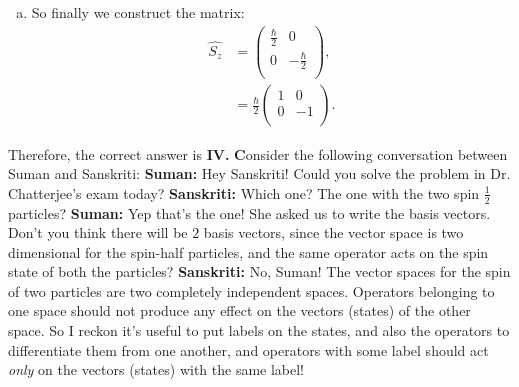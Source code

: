 \documentclass[12pt]{article}
\begin{document}
\begin{enumerate}[1.]
\begin{enumerate}[(a)]
\begin{enumerate}[i.]
                     \end{enumerate} 
              \item So finally we construct the matrix:
                     $$
                            \begin{aligned}
                                   \hat{S_z} & = \left( \begin{array}{lr}
                                                 \frac{\hbar}{2} & 0 \\
                                                 0 & -\frac{\hbar}{2} \\
                                                 \end{array} \right), \\
                                          & = \frac{\hbar}{2} \left( \begin{array}{lr}
                                                 1 & 0 \\
                                                 0 & -1 \\
                                                 \end{array} \right).
                            \end{aligned}
                     $$
       \end{enumerate}
       Therefore, the correct answer is \textbf{IV.} %
       \newpage
\textbf{C}onsider the following conversation between Suman and Sanskriti: \newline
\textbf{Suman:} Hey Sanskriti! Could you solve the problem in Dr. Chatterjee's exam today? \newline
\textbf{Sanskriti:} Which one? The one with the two spin $\frac{1}{2}$ particles? \newline
\textbf{Suman:} Yep that's the one! She asked us to write the basis vectors. Don't you think there will be $2$ basis vectors, since the vector space is two dimensional for the spin-half particles, and the same operator acts on the spin state of both the particles? \newline
\textbf{Sanskriti:} No, Suman! The vector spaces for the spin of two particles are two completely independent spaces. Operators belonging to one space should not produce any effect on the vectors (states) of the other space. So I reckon it's useful to put labels on the states, and also the operators to differentiate them from one another, and operators with some label should act \emph{only} on the vectors (states) with the same label! \newline

\end{enumerate}
\end{document}
